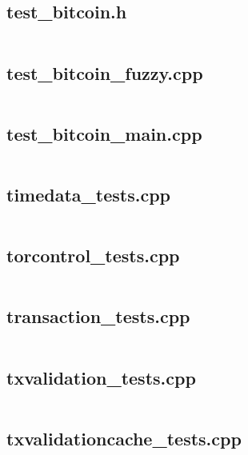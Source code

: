 \documentclass{article}
\begin{document}
\subsection{test\_bitcoin.h}
\inputminted{cpp}{/home/dufferzafar/dev/@clones/bitcoin/src/test/test_bitcoin.h}
\newpage

\subsection{test\_bitcoin\_fuzzy.cpp}
\inputminted{cpp}{/home/dufferzafar/dev/@clones/bitcoin/src/test/test_bitcoin_fuzzy.cpp}
\newpage

\subsection{test\_bitcoin\_main.cpp}
\inputminted{cpp}{/home/dufferzafar/dev/@clones/bitcoin/src/test/test_bitcoin_main.cpp}
\newpage

\subsection{timedata\_tests.cpp}
\inputminted{cpp}{/home/dufferzafar/dev/@clones/bitcoin/src/test/timedata_tests.cpp}
\newpage

\subsection{torcontrol\_tests.cpp}
\inputminted{cpp}{/home/dufferzafar/dev/@clones/bitcoin/src/test/torcontrol_tests.cpp}
\newpage

\subsection{transaction\_tests.cpp}
\inputminted{cpp}{/home/dufferzafar/dev/@clones/bitcoin/src/test/transaction_tests.cpp}
\newpage

\subsection{txvalidation\_tests.cpp}
\inputminted{cpp}{/home/dufferzafar/dev/@clones/bitcoin/src/test/txvalidation_tests.cpp}
\newpage

\subsection{txvalidationcache\_tests.cpp}
\inputminted{cpp}{/home/dufferzafar/dev/@clones/bitcoin/src/test/txvalidationcache_tests.cpp}
\newpage
\end{document}
